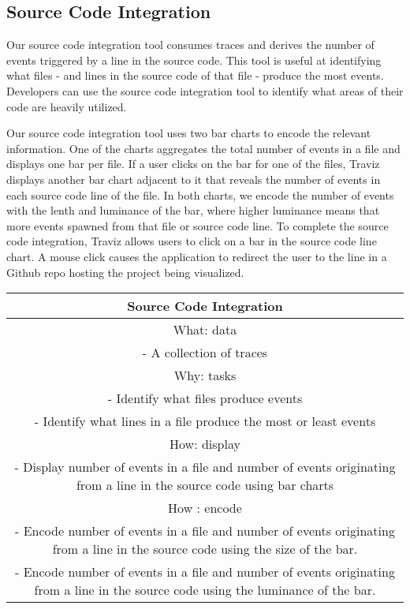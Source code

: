 \subsection{Source Code Integration}

Our source code integration tool consumes traces and derives the number of events
triggered by a line in the source code. This tool is useful at identifying what files - and lines in the source code of that file -
produce the most events. Developers can use the source code integration tool to identify what areas of their code are heavily utilized.

Our source code integration tool uses two bar charts to encode the relevant information. One of the charts aggregates the total number of events in a
file and displays one bar per file. If a user clicks on the bar for one of the files, Traviz displays another bar chart adjacent to it that
reveals the number of events in each source code line of the file. In both charts, we encode the number of events with the lenth and luminance
of the bar, where higher luminance means that more events spawned from that file or source code line. To complete the
source code integration, Traviz allows users to click on a bar in the source code line chart. A mouse click causes the application to
redirect the user to the line in a Github repo hosting the project being visualized.

\begin{center}
    \begin{tabular}{ |c| }
        \hline
        Source Code Integration  \\
        \hline
        What: data \\
         - A collection of traces \\
        \hline
        Why: tasks \\
         - Identify what files produce events \\
         - Identify what lines in a file produce the most or least events \\
        \hline
        How: display \\ 
         - Display number of events in a file and number of events originating from a 
        line in the source code using bar charts\\
        How : encode\\
         - Encode number of events in a file and number of events originating from a line in the source code using the
        size of the bar. \\
         - Encode number of events in a file and number of events originating from a line in the source code using the
         luminance of the bar.
    \end{tabular}
\end{center}


